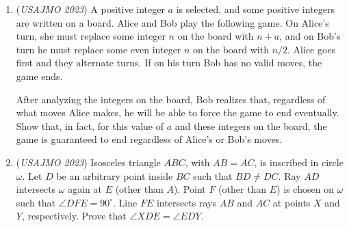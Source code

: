 \begin{enumerate}
 (A simple polygon is a polygon (not necessarily convex) that does not intersect itself and has no holes.)


 

	\item (\textit{USAJMO 2023}) A positive integer $a$ is selected, and some positive integers are written on a board. Alice and Bob play the following game. On Alice's turn, she must replace some integer $n$ on the board with $n+a$, and on Bob's turn he must replace some even integer $n$ on the board with $n/2$. Alice goes first and they alternate turns. If on his turn Bob has no valid moves, the game ends.


 After analyzing the integers on the board, Bob realizes that, regardless of what moves Alice makes, he will be able to force the game to end eventually. Show that, in fact, for this value of $a$ and these integers on the board, the game is guaranteed to end regardless of Alice's or Bob's moves.


 

	\item (\textit{USAJMO 2023}) Isosceles triangle $ABC$, with $AB=AC$, is inscribed in circle $\omega$. Let $D$ be an arbitrary point inside $BC$ such that $BD\neq DC$. Ray $AD$ intersects $\omega$ again at $E$ (other than $A$). Point $F$ (other than $E$) is chosen on $\omega$ such that $\angle DFE = 90^\circ$. Line $FE$ intersects rays $AB$ and $AC$ at points $X$ and $Y$, respectively. Prove that $\angle XDE = \angle EDY$.


 

\end{enumerate}